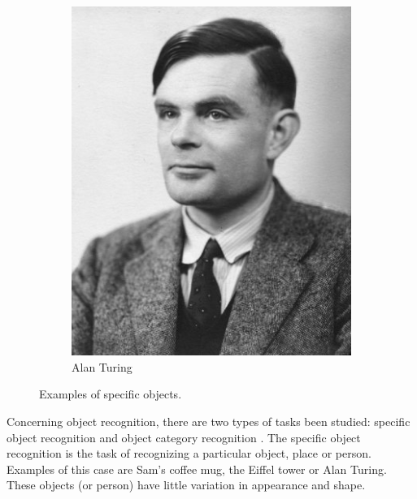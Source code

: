 \documentclass[12pt,final,twoside]{report}
\theoremstyle{plain}
\theoremstyle{definition}
\theoremstyle{remark}
\begin{document}
\begin{figure}[tbhp]
\begin{subfigure}[b]{.3\textwidth}
    \includegraphics[width=\textwidth]{turing}
    \caption{Alan Turing}
  \end{subfigure}
  \caption{Examples of specific objects.}
  \label{fig:specific}
\end{figure}

Concerning object recognition, there are two types of tasks been studied: specific object recognition and object category recognition \cite{grauman_visual_2011}. The specific object recognition is the task of recognizing a particular object, place or person. Examples of this case are Sam's coffee mug, the Eiffel tower or Alan Turing. These objects (or person) have little variation in appearance and shape. 
\end{document}
